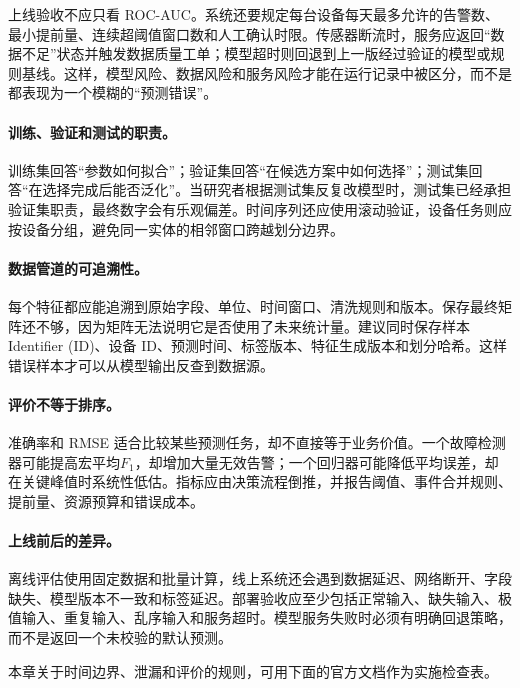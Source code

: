 上线验收不应只看 ROC-AUC。系统还要规定每台设备每天最多允许的告警数、最小提前量、连续超阈值窗口数和人工确认时限。传感器断流时，服务应返回“数据不足”状态并触发数据质量工单；模型超时则回退到上一版经过验证的模型或规则基线。这样，模型风险、数据风险和服务风险才能在运行记录中被区分，而不是都表现为一个模糊的“预测错误”。

\paragraph{训练、验证和测试的职责。}
训练集回答“参数如何拟合”；验证集回答“在候选方案中如何选择”；测试集回答“在选择完成后能否泛化”。当研究者根据测试集反复改模型时，测试集已经承担验证集职责，最终数字会有乐观偏差。时间序列还应使用滚动验证，设备任务则应按设备分组，避免同一实体的相邻窗口跨越划分边界。

\paragraph{数据管道的可追溯性。}
每个特征都应能追溯到原始字段、单位、时间窗口、清洗规则和版本。保存最终矩阵还不够，因为矩阵无法说明它是否使用了未来统计量。建议同时保存样本 Identifier (ID)、设备 ID、预测时间、标签版本、特征生成版本和划分哈希。这样错误样本才可以从模型输出反查到数据源。

\paragraph{评价不等于排序。}
准确率和 RMSE 适合比较某些预测任务，却不直接等于业务价值。一个故障检测器可能提高宏平均$F_1$，却增加大量无效告警；一个回归器可能降低平均误差，却在关键峰值时系统性低估。指标应由决策流程倒推，并报告阈值、事件合并规则、提前量、资源预算和错误成本。

\paragraph{上线前后的差异。}
离线评估使用固定数据和批量计算，线上系统还会遇到数据延迟、网络断开、字段缺失、模型版本不一致和标签延迟。部署验收应至少包括正常输入、缺失输入、极值输入、重复输入、乱序输入和服务超时。模型服务失败时必须有明确回退策略，而不是返回一个未校验的默认预测。

本章关于时间边界、泄漏和评价的规则，可用下面的官方文档作为实施检查表。
